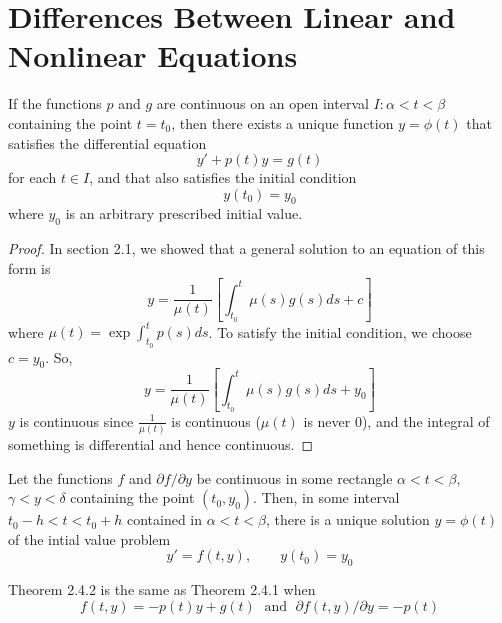 \section{Differences Between Linear and Nonlinear Equations}
    \begin{theorem}
        If the functions $p$ and $g$ are continuous on an open interval $I:\alpha < t < \beta$ containing the point $t = t_0$, then there exists a unique function $y = \phi(t)$ that satisfies the differential equation
        \begin{equation*}
            y' + p(t)y = g(t)
        \end{equation*}
        for each $t \in I$, and that also satisfies the initial condition
        \begin{equation*}
            y(t_0) = y_0
        \end{equation*}
        where $y_0$ is an arbitrary prescribed initial value.
    \end{theorem}
    \begin{proof}
        In section 2.1, we showed that a general solution to an equation of this form is
        \begin{equation*}
            y = \frac{1}{\mu(t)}[\int_{t_0}^t \mu(s)g(s)ds + c]
        \end{equation*}
        where $\mu(t) = \exp \int_{t_0}^t p(s) ds$. To satisfy the initial condition, we choose $c = y_0$. So,
        \begin{equation*}
            y = \frac{1}{\mu(t)}[\int_{t_0}^t \mu(s)g(s)ds + y_0]
        \end{equation*}
        $y$ is continuous since $\frac{1}{\mu(t)}$ is continuous ($\mu(t)$ is never 0), and the integral of something is differential and hence continuous.
    \end{proof}
    \begin{theorem}
        Let the functions $f$ and $\partial f / \partial y$ be continuous in some rectangle $\alpha < t < \beta$, $\gamma < y < \delta$ containing the point $(t_0, y_0)$. Then, in some interval $t_0 - h < t < t_0 + h$ contained in $\alpha < t < \beta$, there is a unique solution $y = \phi(t)$ of the intial value problem
        \begin{equation*}
            y' = f(t, y), \qquad y(t_0) = y_0
        \end{equation*}
    \end{theorem}
    Theorem 2.4.2 is the same as Theorem 2.4.1 when 
    \begin{equation*}
        f(t, y) = -p(t)y + g(t) \; \text{ and } \; \partial f(t, y) / \partial y = -p(t)
    \end{equation*}
